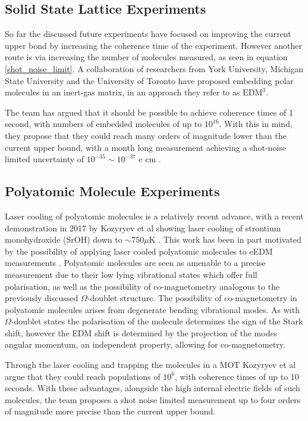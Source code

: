\subsection{Solid State Lattice Experiments}

So far the discussed future experiments have focused on improving the current upper bond by increasing the coherence time of the experiment. However another route is via increasing the number of molecules measured, as seen in equation \ref{shot_noise_limit}. A collaboration of researchers from York University, Michigan State University and the University of Toronto have proposed embedding polar molecules in an inert-gas matrix, in an approach they refer to as $\text{EDM}^3$.

The team has argued that it should be possible to achieve coherence times of 1 second, with numbers of embedded molecules of up to $10^16$. With this in mind, they propose that they could reach many orders of magnitude lower than the current upper bound, with a month long measurement achieving a shot-noise limited uncertainty of $10^{-35} \sim 10^{-37}$ e cm \cite{Vutha_2018_jan}.

\subsection{Polyatomic Molecule Experiments}

Laser cooling of polyatomic molecules is a relatively recent advance, with a recent demonstration in 2017 by Kozyryev et al showing laser cooling of strontium monohydroxide (SrOH) down to ${\sim}750\mu$K \cite{Kozyryev_2017_apr}. This work has been in part motivated by the possibility of applying laser cooled polyatomic molecules to eEDM measurements \cite{Kozyryev_2017}. Polyatomic molecules are seen as amenable to a precise measurement due to their low lying vibrational states which offer full polarisation, as well as the possibility of co-magnetometry analogous to the previously discussed $\Omega$-doublet structure. The possibility of co-magnetometry in polyatomic molecules arises from degenerate bending vibrational modes. As with $\Omega$-doublet states the polarisation of the molecule determines the sign of the Stark shift, however the EDM shift is determined by the projection of the modes angular momentum, an independent property, allowing for co-magnetometry.

Through the laser cooling and trapping the molecules in a MOT Kozyryev et al argue that they could reach populations of $10^{6}$, with coherence times of up to 10 seconds. With these advantages, alongside the high internal electric fields of such molecules, the team proposes a shot noise limited measurement up to four orders of magnitude more precise than the current upper bound.